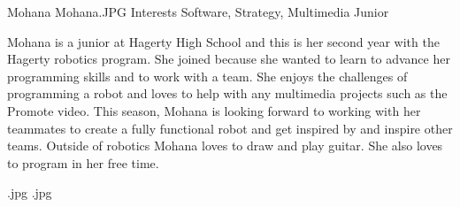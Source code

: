 \insertbio
{Mohana}
{Mohana.JPG}
{Interests}
{Software, Strategy, Multimedia}
{Junior}
{  
Mohana is a junior at Hagerty High School and this is her second year with the Hagerty robotics program. She joined because she wanted to learn to advance her programming skills and to work with a team. She enjoys the challenges of programming a robot and loves to help with any multimedia projects such as the Promote video. This season, Mohana is looking forward to working with her teammates to create a fully functional robot and get inspired by and inspire other teams. Outside of robotics Mohana loves to draw and play guitar. She also loves to program in her free time.  

}
{.jpg}
{.jpg}